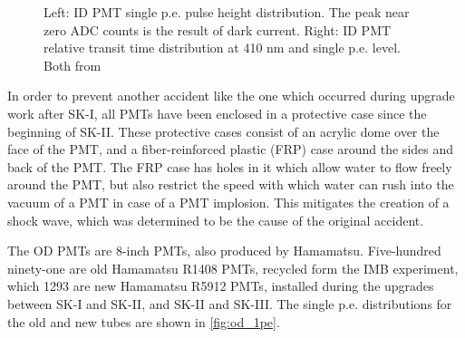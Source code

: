 \begin{figure}
\centering
{}
\caption{Left: ID PMT single p.e. pulse height distribution.  The peak near zero ADC counts is the result of dark current.  Right: ID PMT relative transit time distribution at 410 nm and single p.e. level.  Both from \cite{Fukuda:2002uc}}
\label{fig:pmt_pe_and_timing}
\end{figure}

In order to prevent another accident like the one which occurred during upgrade work after SK-I, all PMTs have been enclosed in a protective case since the beginning of SK-II.  These protective cases consist of an acrylic dome over the face of the PMT, and a fiber-reinforced plastic (FRP) case around the sides and back of the PMT.  The FRP case has holes in it which allow water to flow freely around the PMT, but also restrict the speed with which water can rush into the vacuum of a PMT in case of a PMT implosion.  This mitigates the creation of a shock wave, which was determined to be the cause of the original accident.  \par

The OD PMTs are 8-inch PMTs, also produced by Hamamatsu.  Five-hundred ninety-one are old Hamamatsu R1408 PMTs, recycled form the IMB experiment, which 1293 are new Hamamatsu R5912 PMTs, installed during the upgrades between SK-I and SK-II, and SK-II and SK-III.  The single p.e. distributions for the old and new tubes are shown in \cref{fig:od_1pe}.

